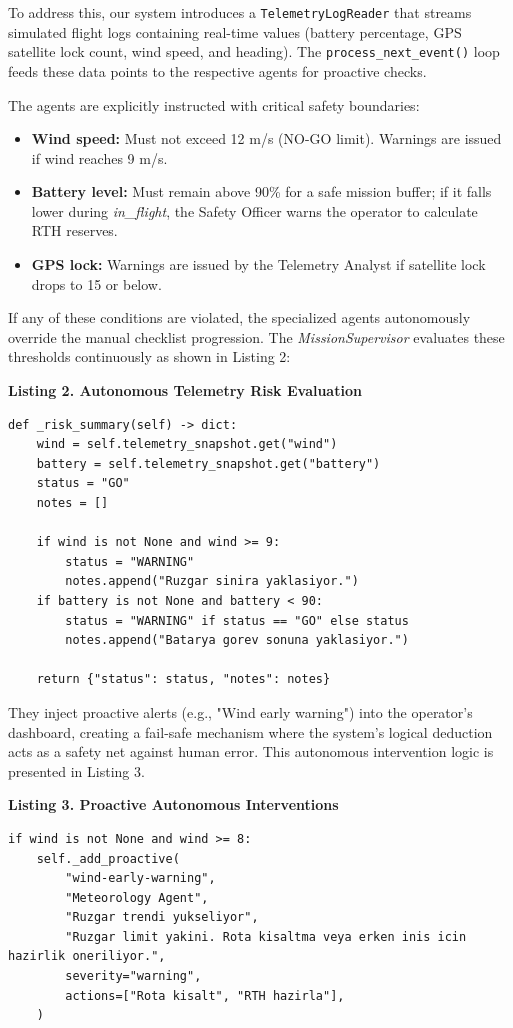\documentclass[conference]{IEEEtran}
\begin{document}
To address this, our system introduces a \texttt{TelemetryLogReader} that streams simulated flight logs containing real-time values (battery percentage, GPS satellite lock count, wind speed, and heading). The \texttt{process\_next\_event()} loop feeds these data points to the respective agents for proactive checks.

The agents are explicitly instructed with critical safety boundaries:
\begin{itemize}
    \item \textbf{Wind speed:} Must not exceed 12 m/s (NO-GO limit). Warnings are issued if wind reaches 9 m/s.
    \item \textbf{Battery level:} Must remain above 90\% for a safe mission buffer; if it falls lower during \textit{in\_flight}, the Safety Officer warns the operator to calculate RTH reserves.
    \item \textbf{GPS lock:} Warnings are issued by the Telemetry Analyst if satellite lock drops to 15 or below.
\end{itemize}

If any of these conditions are violated, the specialized agents autonomously override the manual checklist progression. The \textit{MissionSupervisor} evaluates these thresholds continuously as shown in Listing 2:

\vspace{1em}
\noindent\textbf{Listing 2. Autonomous Telemetry Risk Evaluation}
\begin{lstlisting}
def _risk_summary(self) -> dict:
    wind = self.telemetry_snapshot.get("wind")
    battery = self.telemetry_snapshot.get("battery")
    status = "GO"
    notes = []
    
    if wind is not None and wind >= 9:
        status = "WARNING"
        notes.append("Ruzgar sinira yaklasiyor.")
    if battery is not None and battery < 90:
        status = "WARNING" if status == "GO" else status
        notes.append("Batarya gorev sonuna yaklasiyor.")
        
    return {"status": status, "notes": notes}
\end{lstlisting}

They inject proactive alerts (e.g., "Wind early warning") into the operator's dashboard, creating a fail-safe mechanism where the system's logical deduction acts as a safety net against human error. This autonomous intervention logic is presented in Listing 3.

\vspace{1em}
\noindent\textbf{Listing 3. Proactive Autonomous Interventions}
\begin{lstlisting}
if wind is not None and wind >= 8:
    self._add_proactive(
        "wind-early-warning",
        "Meteorology Agent",
        "Ruzgar trendi yukseliyor",
        "Ruzgar limit yakini. Rota kisaltma veya erken inis icin hazirlik oneriliyor.",
        severity="warning",
        actions=["Rota kisalt", "RTH hazirla"],
    )
\end{lstlisting}
\end{document}

